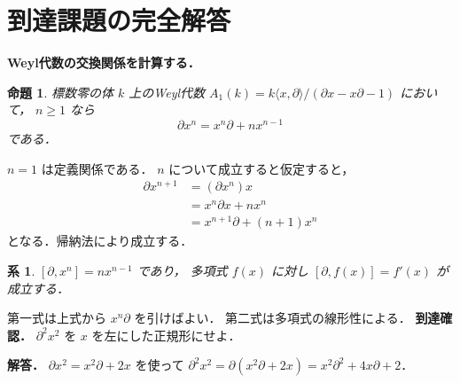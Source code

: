 \documentclass[a5paper,10pt,onecolumn]{jsarticle}
\makeatletter
\theoremstyle{mathnotetheorem}
\newtheorem{proposition}[theorem]{命題}
\newtheorem{corollary}[theorem]{系}
\renewcommand{\proofname}{証明}
\renewenvironment{proof}[1][\proofname]{%
  \par\pushQED{\qed}\normalfont\topsep4\p@\@plus2\p@\relax
  \trivlist\item[\hskip\labelsep\bfseries #1]\ignorespaces
}{\popQED\endtrivlist\@endpefalse}
\makeatother
\begin{document}
\section{到達課題の完全解答}
\noindent\textbf{Weyl代数の交換関係を計算する．}
\begin{proposition}
標数零の体 $k$ 上のWeyl代数
$A_1(k)=k\langle x,\partial\rangle/
(\partial x-x\partial-1)$ において，
$n\ge1$ なら
\[
\partial x^n=x^n\partial+nx^{n-1}
\]
である．
\end{proposition}
\begin{proof}
$n=1$ は定義関係である．
$n$ について成立すると仮定すると，
\[
\begin{aligned}
\partial x^{n+1}
&=(\partial x^n)x\\
&=x^n\partial x+nx^n\\
&=x^{n+1}\partial+(n+1)x^n
\end{aligned}
\]
となる．帰納法により成立する．
\end{proof}
\begin{corollary}
$[\partial,x^n]=nx^{n-1}$ であり，
多項式 $f(x)$ に対し
$[\partial,f(x)]=f'(x)$ が成立する．
\end{corollary}
\begin{proof}
第一式は上式から $x^n\partial$ を引けばよい．
第二式は多項式の線形性による．
\end{proof}
\noindent\textbf{到達確認．}
$\partial^2x^2$ を $x$ を左にした正規形にせよ．
\par\noindent\textbf{解答．}
$\partial x^2=x^2\partial+2x$ を使って
$\partial^2x^2
=\partial(x^2\partial+2x)
=x^2\partial^2+4x\partial+2$．
\end{document}
